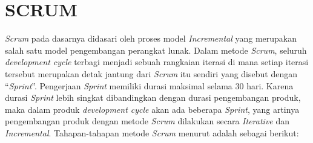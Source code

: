 \section{\uppercase{SCRUM}}
\textit{Scrum} pada dasarnya didasari oleh proses model \textit{Incremental} yang merupakan salah satu model pengembangan perangkat lunak. Dalam metode \textit{Scrum}, seluruh \textit{development cycle} terbagi menjadi sebuah rangkaian iterasi di mana setiap iterasi tersebut merupakan detak jantung dari \textit{Scrum} itu sendiri yang disebut dengan “\textit{Sprint}”. Pengerjaan \textit{Sprint} memiliki durasi maksimal selama 30 hari. Karena durasi \textit{Sprint} lebih singkat dibandingkan dengan durasi pengembangan produk, maka dalam produk \textit{development cycle} akan ada beberapa \textit{Sprint}, yang artinya pengembangan produk dengan metode \textit{Scrum} dilakukan secara \textit{Iterative} dan \textit{Incremental}. Tahapan-tahapan metode \textit{Scrum} menurut \cite{Schwab2013} adalah sebagai berikut:
